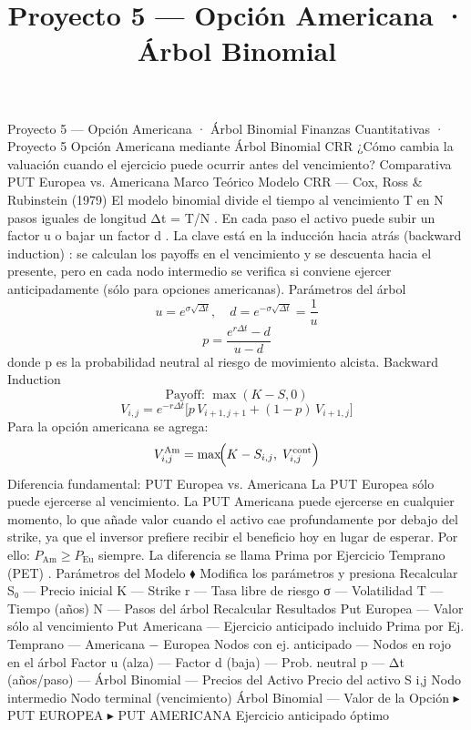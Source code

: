 \documentclass[12pt]{article}
\begin{document}
\title{Proyecto 5 — Opción Americana · Árbol Binomial}
\maketitle

Proyecto 5 — Opción Americana · Árbol Binomial
Finanzas Cuantitativas · Proyecto 5
Opción Americana
mediante Árbol Binomial CRR
¿Cómo cambia la valuación cuando el ejercicio puede ocurrir
antes
del vencimiento? Comparativa PUT Europea vs. Americana
Marco Teórico
Modelo CRR — Cox, Ross & Rubinstein (1979)
El modelo binomial divide el tiempo al vencimiento
T
en
N
pasos iguales de longitud
Δt = T/N
. En cada paso el activo puede subir un factor
u
o bajar un factor
d
.
La clave está en la
inducción hacia atrás (backward induction)
: se calculan los payoffs en el vencimiento y se descuenta hacia el presente, pero en cada nodo intermedio se verifica si conviene ejercer anticipadamente (sólo para opciones americanas).
Parámetros del árbol
\[
          u = e^{\sigma\sqrt{\Delta t}}, \quad d = e^{-\sigma\sqrt{\Delta t}} = \frac{1}{u}
        \]
\[
          p = \frac{e^{r\Delta t} - d}{u - d}
        \]
donde
p
es la
probabilidad neutral al riesgo
de movimiento alcista.
Backward Induction
\[
          \text{Payoff: } \max(K - S, 0)
        \]
\[
          V_{i,j} = e^{-r\Delta t}\bigl[p\,V_{i+1,j+1} + (1-p)\,V_{i+1,j}\bigr]
        \]
Para la
opción americana
se agrega:
\[
          V_{i,j}^{\text{Am}} = \max\!\Bigl(K - S_{i,j},\; V_{i,j}^{\text{cont}}\Bigr)
        \]
Diferencia fundamental: PUT Europea vs. Americana
La
PUT Europea
sólo puede ejercerse al vencimiento. La
PUT Americana
puede ejercerse en cualquier momento, lo que añade valor cuando el activo cae profundamente por debajo del strike, ya que el inversor prefiere recibir el beneficio
hoy
en lugar de esperar.
Por ello:
\(P_{\text{Am}} \geq P_{\text{Eu}}\)
siempre. La diferencia se llama
Prima por Ejercicio Temprano (PET)
.
Parámetros del Modelo
⬧ Modifica los parámetros y presiona Recalcular
S₀ — Precio inicial
K — Strike
r — Tasa libre de riesgo
σ — Volatilidad
T — Tiempo (años)
N — Pasos del árbol
Recalcular
Resultados
Put Europea
—
Valor sólo al vencimiento
Put Americana
—
Ejercicio anticipado incluido
Prima por Ej. Temprano
—
Americana − Europea
Nodos con ej. anticipado
—
Nodos en rojo en el árbol
Factor u (alza)
—
Factor d (baja)
—
Prob. neutral p
—
Δt (años/paso)
—
Árbol Binomial — Precios del Activo
Precio del activo S
i,j
Nodo intermedio
Nodo terminal (vencimiento)
Árbol Binomial — Valor de la Opción
▸ PUT EUROPEA
▸ PUT AMERICANA
Ejercicio anticipado óptimo
\end{document}
